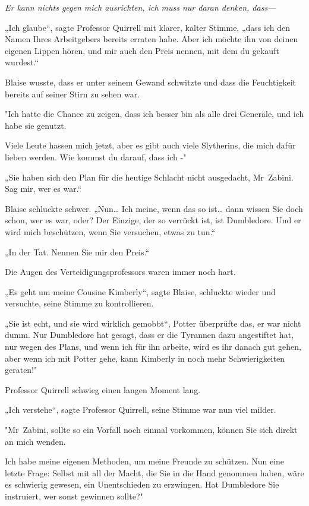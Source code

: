 {\emph{Er kann nichts gegen mich ausrichten, ich muss nur daran denken, dass—}

„Ich glaube“, sagte Professor Quirrell mit klarer, kalter Stimme, „dass ich den Namen Ihres Arbeitgebers bereits erraten habe. Aber ich möchte ihn von deinen eigenen Lippen hören, und mir auch den Preis nennen, mit dem du gekauft wurdest.“

Blaise wusste, dass er unter seinem Gewand schwitzte und dass die Feuchtigkeit bereits auf seiner Stirn zu sehen war.

"Ich hatte die Chance zu zeigen, dass ich besser bin als alle drei Generäle, und ich habe sie genutzt.

Viele Leute hassen mich jetzt, aber es gibt auch viele Slytherins, die mich dafür lieben werden. Wie kommst du darauf, dass ich -"

„Sie haben sich den Plan für die heutige Schlacht nicht ausgedacht, Mr~Zabini. Sag mir, wer es war.“

Blaise schluckte schwer. „Nun… Ich meine, wenn das so ist… dann wissen Sie doch schon, wer es war, oder? Der Einzige, der so verrückt ist, ist Dumbledore. Und er wird mich beschützen, wenn Sie versuchen, etwas zu tun.“

„In der Tat. Nennen Sie mir den Preis.“

Die Augen des Verteidigungsprofessors waren immer noch hart.

„Es geht um meine Cousine Kimberly“, sagte Blaise, schluckte wieder und versuchte, seine Stimme zu kontrollieren.

„Sie ist echt, und sie wird wirklich gemobbt“, Potter überprüfte das, er war nicht dumm. Nur Dumbledore hat gesagt, dass er die Tyrannen dazu angestiftet hat, nur wegen des Plans, und wenn ich für ihn arbeite, wird es ihr danach gut gehen, aber wenn ich mit Potter gehe, kann Kimberly in noch mehr Schwierigkeiten geraten!"

Professor Quirrell schwieg einen langen Moment lang.

„Ich verstehe“, sagte Professor Quirrell, seine Stimme war nun viel milder.

"Mr~Zabini, sollte so ein Vorfall noch einmal vorkommen, können Sie sich direkt an mich wenden.

Ich habe meine eigenen Methoden, um meine Freunde zu schützen. Nun eine letzte Frage: Selbst mit all der Macht, die Sie in die Hand genommen haben, wäre es schwierig gewesen, ein Unentschieden zu erzwingen. Hat Dumbledore Sie instruiert, wer sonst gewinnen sollte?"

}
